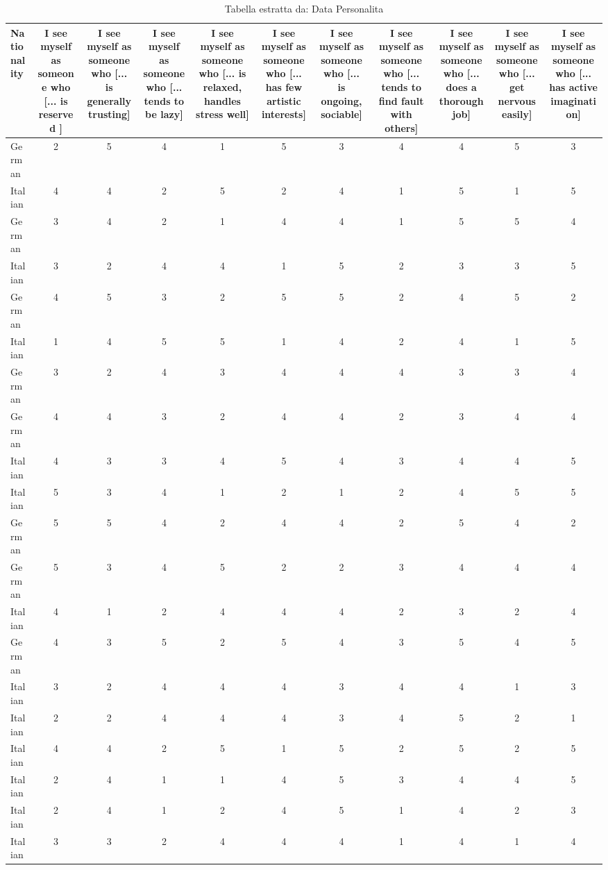 \begin{table}[htbp]
\caption{Tabella estratta da: Data Personalita}
\label{tab:data_personalita}
\begin{tabular}{lcccccccccc}
\toprule
Nationality & I see myself as someone who  [... is reserved ] & I see myself as someone who  [... is generally trusting] & I see myself as someone who  [... tends to be lazy] & I see myself as someone who  [... is relaxed, handles stress well] & I see myself as someone who  [... has few artistic interests] & I see myself as someone who  [... is ongoing, sociable] & I see myself as someone who  [... tends to find fault with others] & I see myself as someone who  [... does a thorough job] & I see myself as someone who  [... get nervous easily] & I see myself as someone who  [... has active imagination] \\
\midrule
German & 2 & 5 & 4 & 1 & 5 & 3 & 4 & 4 & 5 & 3 \\
Italian & 4 & 4 & 2 & 5 & 2 & 4 & 1 & 5 & 1 & 5 \\
German & 3 & 4 & 2 & 1 & 4 & 4 & 1 & 5 & 5 & 4 \\
Italian & 3 & 2 & 4 & 4 & 1 & 5 & 2 & 3 & 3 & 5 \\
German & 4 & 5 & 3 & 2 & 5 & 5 & 2 & 4 & 5 & 2 \\
Italian & 1 & 4 & 5 & 5 & 1 & 4 & 2 & 4 & 1 & 5 \\
German & 3 & 2 & 4 & 3 & 4 & 4 & 4 & 3 & 3 & 4 \\
German & 4 & 4 & 3 & 2 & 4 & 4 & 2 & 3 & 4 & 4 \\
Italian & 4 & 3 & 3 & 4 & 5 & 4 & 3 & 4 & 4 & 5 \\
Italian & 5 & 3 & 4 & 1 & 2 & 1 & 2 & 4 & 5 & 5 \\
German & 5 & 5 & 4 & 2 & 4 & 4 & 2 & 5 & 4 & 2 \\
German & 5 & 3 & 4 & 5 & 2 & 2 & 3 & 4 & 4 & 4 \\
Italian & 4 & 1 & 2 & 4 & 4 & 4 & 2 & 3 & 2 & 4 \\
German & 4 & 3 & 5 & 2 & 5 & 4 & 3 & 5 & 4 & 5 \\
Italian & 3 & 2 & 4 & 4 & 4 & 3 & 4 & 4 & 1 & 3 \\
Italian & 2 & 2 & 4 & 4 & 4 & 3 & 4 & 5 & 2 & 1 \\
Italian & 4 & 4 & 2 & 5 & 1 & 5 & 2 & 5 & 2 & 5 \\
Italian & 2 & 4 & 1 & 1 & 4 & 5 & 3 & 4 & 4 & 5 \\
Italian & 2 & 4 & 1 & 2 & 4 & 5 & 1 & 4 & 2 & 3 \\
Italian & 3 & 3 & 2 & 4 & 4 & 4 & 1 & 4 & 1 & 4 \\

\end{tabular}
\end{table}
